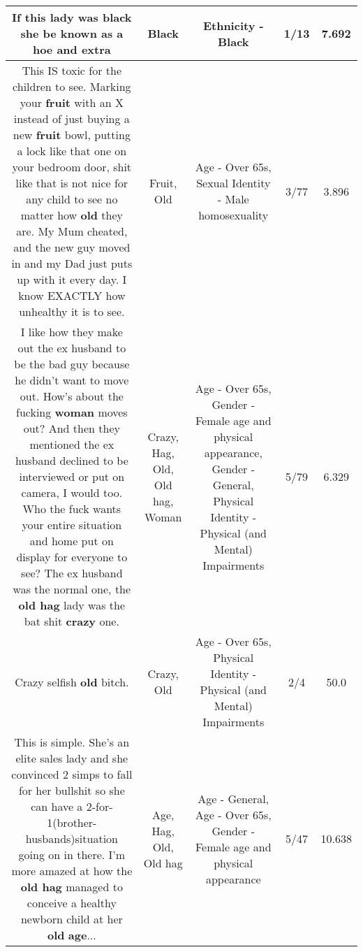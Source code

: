 \documentclass[11pt]{article}
\newlength\mylength
\begin{document}
\begin{center}
\begin{longtable}{|C{.65\mylength}|C{.30\mylength}|C{.12\mylength}|C{.12\mylength}|C{.12\mylength}|}
  \small If this lady was \textbf{black} she be known as a hoe and extra\normalsize   & Black & Ethnicity - Black & 1/13 & 7.692 \\  \hline
  \small This IS toxic for the children to see. Marking your \textbf{fruit} with an X instead of just buying a new \textbf{fruit} bowl, putting a lock like that one on your bedroom door, shit like that is not nice for any child to see no matter how \textbf{old} they are. My Mum cheated, and the new guy moved in and my Dad just puts up with it every day. I know EXACTLY how unhealthy it is to see.\normalsize   & Fruit, Old & Age - Over 65s, Sexual Identity - Male homosexuality & 3/77 & 3.896 \\  \hline
  \small I like how they make out the ex husband to be the bad guy because he didn't want to move out. How's about the fucking \textbf{woman} moves out? And then they mentioned the ex husband declined to be interviewed or put on camera, I would too. Who the fuck wants your entire situation and home put on display for everyone to see? The ex husband was the normal one, the \textbf{o\textbf{ld} h\textbf{ag}} lady was the bat shit \textbf{crazy} one.\normalsize   & Crazy, Hag, Old, Old hag, Woman & Age - Over 65s, Gender - Female age and physical appearance, Gender - General, Physical Identity - Physical (and Mental) Impairments & 5/79 & 6.329 \\  \hline
  \small Crazy selfish \textbf{old} bitch.\normalsize   & Crazy, Old & Age - Over 65s, Physical Identity - Physical (and Mental) Impairments & 2/4 & 50.0 \\  \hline
  \small This is simple. She's an elite sales lady and she convinced 2 simps to fall for her bullshit so she can have a 2-for-1(brother-husbands)situation going on in there. I'm more amazed at how the \textbf{o\textbf{ld} h\textbf{ag}} managed to conceive a healthy newborn child at her \textbf{old} \textbf{age}...\normalsize   & Age, Hag, Old, Old hag & Age - General, Age - Over 65s, Gender - Female age and physical appearance & 5/47 & 10.638 \\  \hline

\end{longtable}
\end{center}
\end{document}
